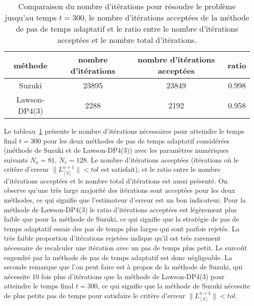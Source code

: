 \begin{table}[h]
	\centering
	\begin{tabular}{c|c|c|c}
      méthode             & nombre d'itérations & nombre d'itérations acceptées & ratio \\
      \hline
      Suzuki              & 23895                & 23849                        & 0.998 \\
      Lawson-DP4(3)       & 2288                 & 2192                         & 0.958 \\
	\end{tabular}
	\caption{Comparaison du nombre d'itérations pour résoudre le problème jusqu'au temps $t=300$, le nombre d'itérations acceptées de la méthode de pas de temps adaptatif et le ratio entre le nombre d'itérations acceptées et le nombre total d'itérations.}
	\label{tab:compare:iteration}
\end{table}

Le tableau~\ref{tab:compare:iteration} présente le nombre d'itérations nécessaires pour atteindre le temps final $t=300$ pour les deux méthodes de pas de temps adaptatif considérées (méthode de Suzuki et de Lawson-DP4(3)) avec les paramètres numériques suivants $N_x=81$, $N_v=128$. Le nombre d'itérations acceptées (itérations où le critère d'erreur $\|L_{[3]}^{n+1}\|<tol$ est satisfait), et le ratio entre le nombre d'itérations acceptées et le nombre total d'itérations est aussi présenté. On observe qu'une très large majorité des itérations sont acceptées pour les deux méthodes, ce qui signifie que l'estimateur d'erreur est un bon indicateur. Pour la méthode de Lawson-DP4(3) le ratio d'itérations acceptées est légèrement plus faible que pour la méthode de Suzuki, ce qui signifie que la stratégie de pas de temps adaptatif essaie des pas de temps plus larges qui sont parfois rejetés. La très faible proportion d'itérations rejetées indique qu'il est très rarement nécessaire de recalculer une itération avec un pas de temps plus petit. Le surcoût engendré par la méthode de pas de temps adaptatif est donc négligeable. La seconde remarque que l'on peut faire est à propos de la méthode de Suzuki, qui nécessite 10 fois plus d'itérations que la méthode de Lawson-DP4(3) pour atteindre le temps final $t=300$, ce qui signifie que la méthode de Suzuki nécessite de plus petits pas de temps pour satisfaire le critère d'erreur $\|L_{[3]}^{n+1}\|<tol$.

